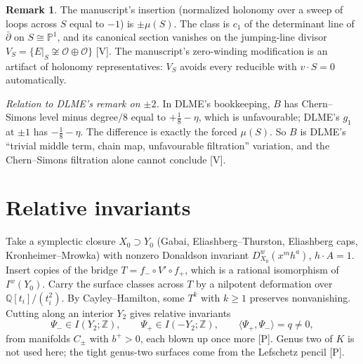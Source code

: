 \documentclass[10pt]{amsart}
\theoremstyle{definition}\newtheorem{definition}[theorem]{Definition}\newtheorem{remark}[theorem]{Remark}
\newcommand{\Z}{\mathbb Z}\newcommand{\Q}{\mathbb Q}\newcommand{\F}{\mathbb F}
\newcommand{\V}{\textsf{[V]}}\newcommand{\Pl}{\textsf{[P]}}\newcommand{\Sp}{\textsf{[S]}}
\begin{document}
\begin{remark}
The manuscript's insertion (normalized holonomy over a sweep of loops across $S$ equal to $-1$) is $\pm\mu(S)$. The class is $c_1$ of the determinant line of $\bar\partial$ on $S\cong\mathbb P^1$, and its canonical section vanishes on the jumping-line divisor $V_S=\{E|_S\not\cong\mathcal O\oplus\mathcal O\}$ \V. The manuscript's zero-winding modification is an artifact of holonomy representatives: $V_S$ avoids every reducible with $v\cdot S=0$ automatically.
\end{remark}

\noindent\emph{Relation to DLME's remark on $\pm2$.} In DLME's bookkeeping, $B$ has Chern--Simons level minus degree$/8$ equal to $+\tfrac18-\eta$, which is unfavourable; DLME's $g_1$ at $\pm1$ has $-\tfrac18-\eta$. The difference is exactly the forced $\mu(S)$. So $B$ is DLME's ``trivial middle term, chain map, unfavourable filtration'' variation, and the Chern--Simons filtration alone cannot conclude \V.

\section{Relative invariants}
Take a symplectic closure $X_0\supset Y_0$ (Gabai, Eliashberg--Thurston, Eliashberg caps, Kronheimer--Mrowka) with nonzero Donaldson invariant $D^w_{X_0}(x^mh^a)$, $h\cdot A=1$. Insert copies of the bridge $T=f_-\circ V'\circ f_+$, which is a rational isomorphism of $I^w(Y_0)$. Carry the surface classes across $T$ by a nilpotent deformation over $\Q[t_i]/(t_i^2)$. By Cayley--Hamilton, some $T^k$ with $k\ge1$ preserves nonvanishing. Cutting along an interior $Y_2$ gives relative invariants
\[
\Psi_-\in I(Y_2;\Z),\qquad \Psi_+\in I(-Y_2;\Z),\qquad \langle\Psi_+,\Psi_-\rangle=q\neq0,
\]
from manifolds $C_\pm$ with $b^+>0$, each blown up once more \Pl. Genus two of $K$ is not used here; the tight genus-two surfaces come from the Lefschetz pencil \Pl.
\end{document}
